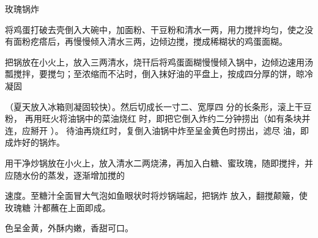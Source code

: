 \begin{recipe}{玫瑰锅炸}

\ingredients


\preparation

\step 将鸡蛋打破去壳倒入大碗中，加面粉、干豆粉和清水一两，用力搅拌均匀，使之没
有面粉疙瘩后，再慢慢倾入清水三两，边倾边搅，搅成稀糊状的鸡蛋面糊。

\step 把锅放在小火上，放入三两清水，烧幵后将鸡蛋面糊慢慢倾入锅中，边倾边速用汤
瓢搅拌，要搅匀；至浓缩而不沾时，倒入抹好油的平盘上，按成四分厚的饼，晾冷凝固

（夏天放入冰箱则凝固较快）。然后切成长一寸二、宽厚四 分的长条形，滚上干豆粉，
再用旺火将油锅中的菜油烧红 时，即把它倒入炸约二分钟捞出（如有条块并连，应掰开
）。 待油再烧红时，复倒入油锅中炸至呈金黄色时捞出，滤尽 油，即成炸好的锅炸。

\step 用干净炒锅放在小火上，放入清水二两烧沸，再加入白糖、蜜玫瑰，随即搅拌，并
应随水份的蒸发，逐渐增加搅的

速度。至糖汁全面冒大气泡如鱼眼状时将炒锅端起，把锅炸 放入，翻搅颠簸，使玫瑰糖
汁都蘸在上面即成。

\features

色呈金黄，外酥内嫩，香甜可口。

\end{recipe}

